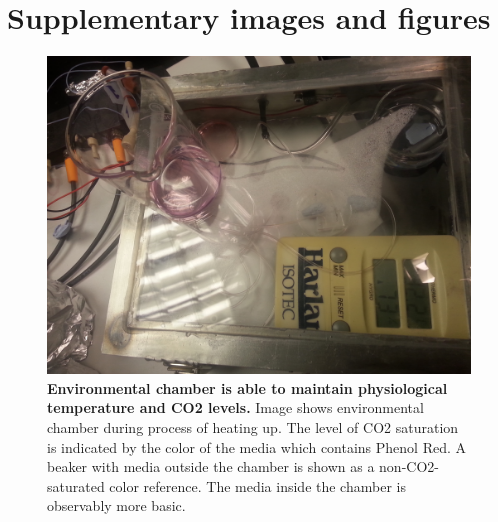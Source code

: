 \newpage
\section{Supplementary images and figures}
       \begin{figure}[!h]
            \centering
            \includegraphics[width=15cm]{chapter2/figures/Chamber/ChamberInOperation.jpg}
            \caption[Image of environmental chamber]{\textbf{Environmental chamber is able to maintain physiological temperature and CO\textsc{2} levels.} Image shows environmental chamber during process of heating up. The level of CO\textsc{2} saturation is indicated by the color of the media which contains Phenol Red. A beaker with media outside the chamber is shown as a non-CO\textsc{2}-saturated color reference. The media inside the chamber is observably more basic.}
            \label{fig:app:chamber}

        \end{figure}

